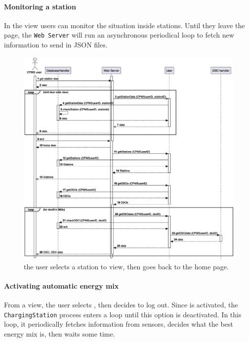 \pagebreak

\paragraph{Monitoring a station} In the  view users can monitor the situation inside stations. Until they leave the page, the \texttt{Web Server} will run an asynchronous periodical loop to fetch new information to send in JSON files. 

\begin{figure}[h!]
    \centering
    \includegraphics[width=\columnwidth]{./images/sequences/cpms/monitor}
    \caption{the user selects a station to view, then goes back to the home page.}
\end{figure}

\pagebreak

\paragraph{Activating automatic energy mix} From a  view, the user selects , then decides to log out. Since  is activated, the \texttt{ChargingStation} process enters a loop until this option is deactivated. In this loop, it periodically fetches information from sensors, decides what the best energy mix is, then waits some time.

